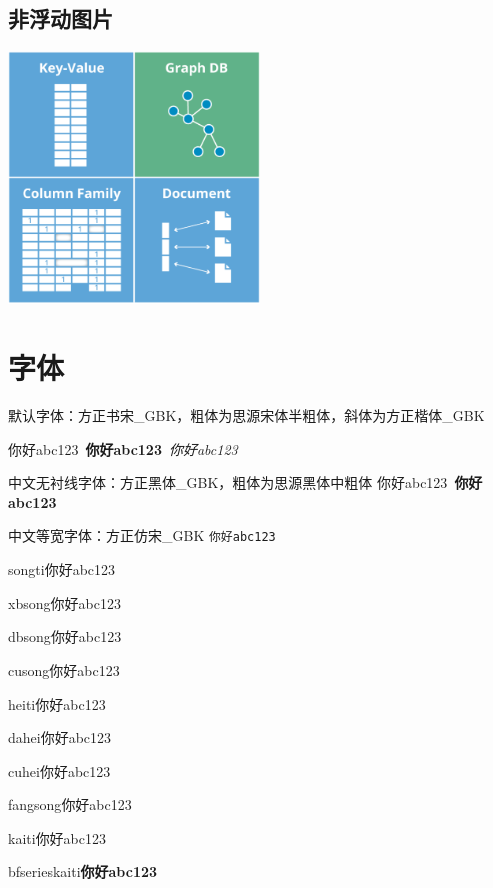 \documentclass[11pt, a4paper, oneside, fontset=none]{ctexbook}
\begin{document}
\section{非浮动图片}
\begin{center}
  \begin{minipage}{\textwidth}
    \center
    \includegraphics[width=0.5\textwidth]{picture/NoSQL数据库示意图.png}
    \captionsetup{hypcap=false}
    \label{fig:NosqlDatabase}
  \end{minipage}
\end{center}

\chapter{字体}
默认字体：方正书宋\_GBK，粗体为思源宋体半粗体，斜体为方正楷体\_GBK

你好abc123\ \textbf{你好abc123}\  \textit{你好abc123}\  

中文无衬线字体：方正黑体\_GBK，粗体为思源黑体中粗体
\textsf{你好abc123}\ \textbf{\textsf{你好abc123}}

中文等宽字体：方正仿宋\_GBK
\texttt{你好abc123}

songti{\songti 你好abc123}

xbsong{\xbsong 你好abc123}

dbsong{\dbsong 你好abc123}

cusong{\cusong 你好abc123}

heiti{\heiti 你好abc123}

dahei{\dahei 你好abc123}

cuhei{\cuhei 你好abc123}

fangsong{\fangsong 你好abc123}

kaiti{\kaiti 你好abc123}

bfserieskaiti{\bfseries\kaiti 你好abc123}
\end{document}
